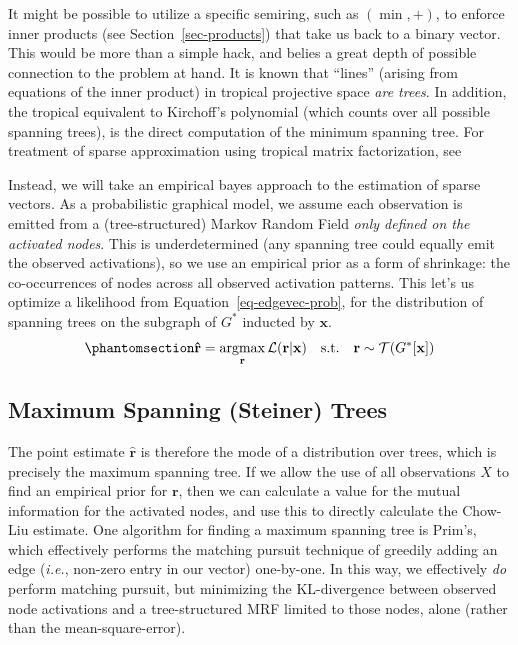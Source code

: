 \documentclass[%
	12pt,
		oneside,
		letterpaper
]{book}
\begin{document}
It might be possible to utilize a specific semiring, such as
\((\min,+)\), to enforce inner products (see Section~\ref{sec-products})
that take us back to a binary vector. This would be more than a simple
hack, and belies a great depth of possible connection to the problem at
hand. It is known that ``lines'' (arising from equations of the inner
product) in tropical projective space \emph{are
trees}.\autocite{tropicalGrassmannian_2004} In addition, the tropical
equivalent to Kirchoff's polynomial (which counts over all possible
spanning trees), is the direct computation of the minimum spanning
tree.\autocite{TropicalKirchhoffsformula_Jukna2021} For treatment of
sparse approximation using tropical matrix factorization, see
\textcite{Sparsedataembedding_Omanovic2021}

Instead, we will take an empirical bayes approach to the estimation of
sparse vectors.\autocite{EmpiricalBayesianStrategy_Wipf2007} As a
probabilistic graphical model, we assume each observation is emitted
from a (tree-structured) Markov Random Field \emph{only defined on the
activated nodes}. This is underdetermined (any spanning tree could
equally emit the observed activations), so we use an empirical prior as
a form of shrinkage: the co-occurrences of nodes across all observed
activation patterns. This let's us optimize a likelihood from
Equation~\ref{eq-edgevec-prob}, for the distribution of spanning trees
on the subgraph of \(G^*\) inducted by \(\mathbf{x}\).
\begin{equation}\phantomsection\label{eq-sparse-approx-tree}{
\mathbf{\hat{r}} = \operatorname*{argmax}_{\mathbf{r}}{\mathcal{L}(\mathbf{r}|\mathbf{x})} \quad \text{s.t.}\quad \mathbf{r}\sim \mathcal{T}(G^*[\mathbf{x}])
}\end{equation}

\subsection{Maximum Spanning (Steiner) Trees}\label{sec-steiner}

The point estimate \(\hat{\mathbf{r}}\) is therefore the mode of a
distribution over trees, which is precisely the maximum spanning
tree.\autocite{EfficientComputationExpectations_Zmigrod2021} If we allow
the use of all observations \(X\) to find an empirical prior for
\(\mathbf{r}\), then we can calculate a value for the mutual information
for the activated nodes, and use this to directly calculate the Chow-Liu
estimate. One algorithm for finding a maximum spanning tree is
Prim's\autocite{Datastructuresnetwork_Tarjan1983}, which effectively
performs the matching pursuit technique of greedily adding an edge
(\emph{i.e.}, non-zero entry in our vector) one-by-one. In this way, we
effectively \emph{do} perform matching pursuit, but minimizing the
KL-divergence between observed node activations and a tree-structured
MRF limited to those nodes, alone (rather than the mean-square-error).
\end{document}
